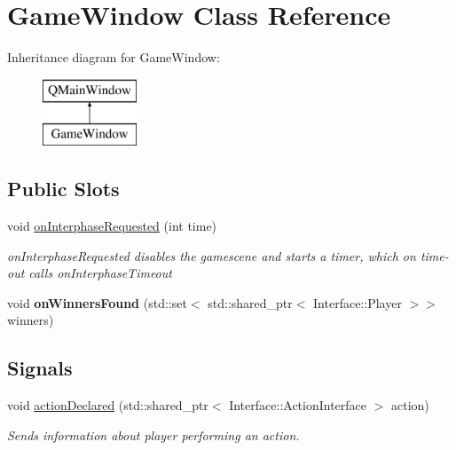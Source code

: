 \hypertarget{class_game_window}{\section{Game\-Window Class Reference}
\label{class_game_window}
}
Inheritance diagram for Game\-Window\-:\begin{figure}[H]
\begin{center}
\leavevmode
\includegraphics[height=2.000000cm]{class_game_window}
\end{center}
\end{figure}
\subsection*{Public Slots}
\begin{DoxyCompactItemize}
\item 
void \hyperlink{class_game_window_a5b28dc68943f74e53f7f289c7a38b2f8}{on\-Interphase\-Requested} (int time)
\begin{DoxyCompactList}\small\item\em on\-Interphase\-Requested disables the gamescene and starts a timer, which on time-\/out calls on\-Interphase\-Timeout \end{DoxyCompactList}\item 
\hypertarget{class_game_window_ad7bb7e90967445ef29f022c03f682fd2}{void {\bfseries on\-Winners\-Found} (std\-::set$<$ std\-::shared\-\_\-ptr$<$ Interface\-::\-Player $>$$>$ winners)}\label{class_game_window_ad7bb7e90967445ef29f022c03f682fd2}

\end{DoxyCompactItemize}
\subsection*{Signals}
\begin{DoxyCompactItemize}
\item 
void \hyperlink{class_game_window_a0a2e1537be9e7d811774e0b2fa2e524b}{action\-Declared} (std\-::shared\-\_\-ptr$<$ Interface\-::\-Action\-Interface $>$ action)
\begin{DoxyCompactList}\small\item\em Sends information about player performing an action. \end{DoxyCompactList}\end{DoxyCompactItemize}
